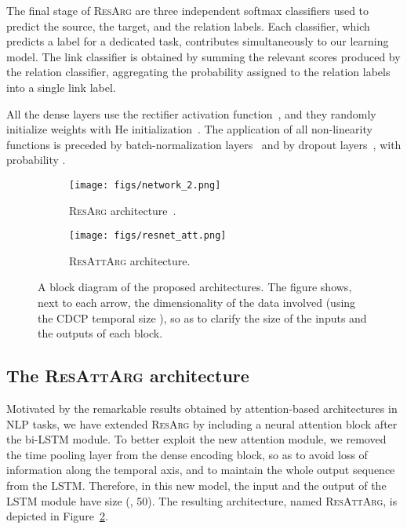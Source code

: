 \documentclass[journal]{IEEEtran}
\begin{document}
The final stage of \textsc{ResArg} are three independent softmax classifiers used to predict the source, the target, and the relation labels. Each classifier, which predicts a label for a dedicated task, contributes simultaneously to our learning model. The link classifier is obtained by summing the relevant scores produced by the relation classifier, aggregating the probability assigned to the relation labels into a single link label.

All the dense layers use the rectifier activation function~\cite{glorot11a}, and they randomly initialize weights with He initialization~\cite{HeZR015}.
The application of all non-linearity functions is preceded by batch-normalization layers~\cite{pmlr-v37-ioffe15} and by dropout layers~\cite{Srivastava2014}, with probability .

\begin{figure*}[t]
  \centering
  
  \begin{subfigure}{.4\textwidth}
  \centering
  \texttt{[image: figs/network\_2.png]}
  \caption[\textsc{ResArg} architecture.]{\textsc{ResArg} architecture~\cite{W18-5201}.}
  \label{fig:resnetworklinksa}
\end{subfigure}\begin{subfigure}{.4\textwidth}
  \centering
  \texttt{[image: figs/resnet\_att.png]}
  \caption{\textsc{ResAttArg} architecture.}
  \label{fig:resnetworklinksb}
\end{subfigure}

  \caption[A block diagram of the proposed architectures.]{A block diagram of the proposed architectures. The figure shows, next to each arrow, the dimensionality of the data involved (using the CDCP temporal size ), so as to clarify the size of the inputs and the outputs of each block.
  \label{fig:resnetworklinks}}
\end{figure*}


\subsection{The \textsc{ResAttArg} architecture}

Motivated by the remarkable results obtained by attention-based architectures in NLP tasks, we have extended \textsc{ResArg} by including  a neural attention block after the bi-LSTM module.
To better exploit the new attention module, we removed the time pooling layer from the dense encoding block, so as to avoid loss of information along the temporal axis, and to maintain the whole output sequence from the LSTM. Therefore, in this new model, the input and the output of the LSTM module have size (, 50). The resulting architecture, named \textsc{ResAttArg}, is depicted in Figure~\ref{fig:resnetworklinksb}.
\end{document}
